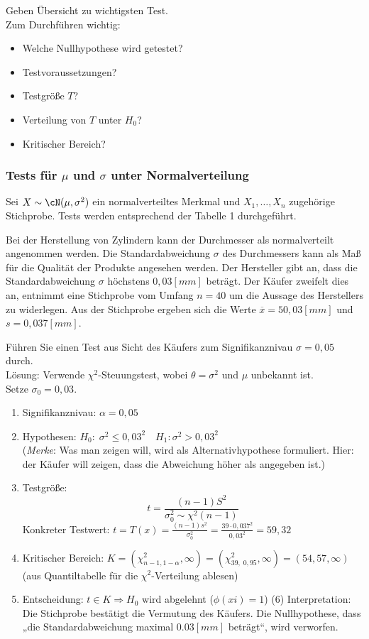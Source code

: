 Geben Übersicht zu wichtigsten Test.\\
Zum Durchführen wichtig:
\begin{itemize}
\item Welche Nullhypothese wird getestet?
\item Testvoraussetzungen?
\item Testgröße $T$?
\item Verteilung von $T$ unter $H_0$?
\item Kritischer Bereich?
\end{itemize}

\subsubsection[Tests für mü und sigma unter Normalverteilung]{Tests für $\mu$ und $\sigma$ unter Normalverteilung}

Sei $X\sim \cN(\mu, \sigma^2)$ ein normalverteiltes Merkmal und $X_1, \ldots, X_n$ zugehörige Stichprobe. Tests werden entsprechend der Tabelle 1 durchgeführt.

Bei der Herstellung von Zylindern kann der Durchmesser als normalverteilt
angenommen werden. Die Standardabweichung $\sigma$ des Durchmessers kann als Maß für die Qualität der Produkte angesehen werden. Der Hersteller gibt an, dass die Standardabweichung $\sigma$ höchstens $0,03 \unit{[mm]}$ beträgt. Der Käufer zweifelt dies an, entnimmt eine Stichprobe vom Umfang $n = 40$ um die Aussage des Herstellers zu widerlegen. Aus der Stichprobe ergeben sich die
Werte $\overline{x} = 50,03 \unit{[mm]}$ und $s = 0,037 \unit{[mm]}$.

Führen Sie einen Test aus Sicht des Käufers zum Signifikanznivau $ \sigma = 0,05$ durch.\medskip\\
Lösung: Verwende $\chi^2$-Steuungstest, wobei $\theta = \sigma^2$ und $\mu$ unbekannt ist.\\
Setze $\sigma_0 = 0,03$.
\begin{enumerate}
\item Signifikanznivau: $\alpha = 0,05$
\item Hypothesen: $H_0: \; \sigma^2 \leq 0,03^2 \quad H_1: \sigma^2 > 0,03^2$\\
(\emph{Merke}: Was man zeigen will, wird als Alternativhypothese formuliert. Hier: der Käufer will zeigen, dass die Abweichung höher als angegeben ist.)
\item Testgröße:
$$t=\frac{(n-1)S^2}{\sigma_0^2 \sim \chi^2 (n-1)}$$
Konkreter Testwert: $t=T(x)=\frac{(n-1)s^2}{\sigma_0^2}=\frac{39 \cdot 0,037^2}{0,03^2}=59,32$
\item  Kritischer Bereich: $K=(\chi^2_{n-1, 1-\alpha}, \infty) = (\chi^2_{39, \; 0,95}, \infty) = (54,57, \infty)$\\
(aus Quantiltabelle für die $\chi^2$-Verteilung ablesen)
\item Entscheidung: $t \in K \Rightarrow H_0$ wird abgelehnt ($\phi(xi)=1$)
(6) Interpretation: Die Stichprobe bestätigt die Vermutung des Käufers. Die Nullhypothese, dass „die Standardabweichung maximal $0.03\unit{[mm]}$ beträgt“, wird verworfen.
\end{enumerate}

